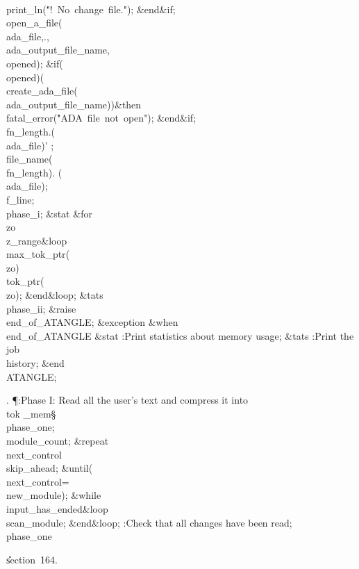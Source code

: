 \\{print\_ln}\?\1(\?\.{"!\ No\ change\ file."}\?\2)\?;\2\6
\&{end}\8\2\&{if}\1;\6
\\{open\_a\_file}\?\1(\?\\{ada\_file}\?,\?\?.\?\?,%
\?\\{ada\_output\_file\_name}\?,\?\\{opened}\?\2)\?;\6
\&{if}\1\1\?\8\1(\R\?\\{opened}\?\2)\ANT\1(\R\?\\{create\_ada\_file}\?\1(\?%
\\{ada\_output\_file\_name}\?\2)\2)\?\2\8\&{then}\6
\\{fatal\_error}\?\1(\?\.{"ADA\ file\ not\ open"}\?\2)\?;\2\6
\&{end}\8\2\&{if}\1;\6
\\{fn\_length}\?\K\?\?.\?\?\1(\?\\{ada\_file}\?\2)'\?%
;\5
\\{file\_name}\?\1(\?\to\?\\{fn\_length}\?\2)\K\?\?.\?\?%
\1(\?\\{ada\_file}\?\2)\?;\5
\\{f\_line}\?\K{};\5
\\{phase\_i};\6
\&{stat}\1\6
\4\&{for}\8\\{zo}\?\in\?\\{z\_range}\8\&{loop}\6
\\{max\_tok\_ptr}\?\1(\?\\{zo}\?\2)\K\?\\{tok\_ptr}\?\1(\?\\{zo}\?\2)\?;\2\6
\&{end}\8\&{loop};\2\6
\&{tats}\6
\\{phase\_ii};\5
\&{raise}\8\\{end\_of\_ATANGLE}; \4\&{exception} \6
\4\&{when}\8\\{end\_of\_ATANGLE}\KR\6
\&{stat}\1\6
:Print statistics about memory usage\X;\2\6
\&{tats}\6
\hbox{\4\4}\6
:Print the job \\{history}\X;\2\6
\&{end}\8\\{ATANGLE};\par
\fi

. \P\?:Phase I: Read all the user's text and compress it into \\{tok%
\_mem}\X\S\?\6
\\{phase\_one}\?\K\?;\5
\\{module\_count}\?\K{};\6
\1\&{repeat}\6
\\{next\_control}\?\K\?\\{skip\_ahead};\2\6
\&{until}\?\8\1(\?\\{next\_control}\?=\?\\{new\_module}\?\2)\?;\6
\1\&{while}\?\8\R\?\\{input\_has\_ended}\8\&{loop}\6
\\{scan\_module};\2\6
\&{end}\8\&{loop};\6
:Check that all changes have been read\X;\6
\\{phase\_one}\?\K\?\par
\U section~164.\fi

